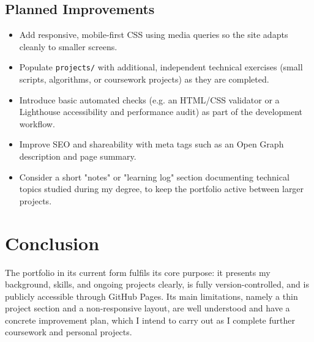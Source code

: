 \documentclass[11pt,a4paper]{article}
\begin{document}
\subsection{Planned Improvements}
\begin{itemize}
  \item Add responsive, mobile-first CSS using media queries so the site adapts cleanly to
        smaller screens.
  \item Populate \texttt{projects/} with additional, independent technical exercises (small
        scripts, algorithms, or coursework projects) as they are completed.
  \item Introduce basic automated checks (e.g. an HTML/CSS validator or a Lighthouse
        accessibility and performance audit) as part of the development workflow.
  \item Improve SEO and shareability with meta tags such as an Open Graph description and page
        summary.
  \item Consider a short "notes" or "learning log" section documenting technical topics studied
        during my degree, to keep the portfolio active between larger projects.
\end{itemize}

\section{Conclusion}
The portfolio in its current form fulfils its core purpose: it presents my background, skills,
and ongoing projects clearly, is fully version-controlled, and is publicly accessible through
GitHub Pages. Its main limitations, namely a thin project section and a non-responsive layout,
are well understood and have a concrete improvement plan, which I intend to carry out as I
complete further coursework and personal projects.
\end{document}
